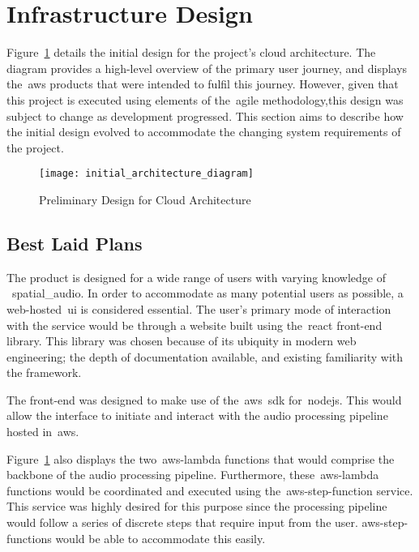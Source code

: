 \thispagestyle{plain}
\newpage
\section{Infrastructure Design}\label{sec:infrastructure-design}

\normalsize

Figure~\ref{fig:preliminary-design} details the initial design for the project's cloud architecture.
The diagram provides a high-level overview of the primary user journey,
and displays the~\gls{aws} products that were intended to fulfil this journey.
However, given that this project is executed using elements of the~\gls{agile} methodology,this design was subject to change as development progressed.
This section aims to describe how the initial design evolved to accommodate the changing system requirements of the project.

\begin{figure}[!htb]
    \minipage{\textwidth}
    \texttt{[image: initial\_architecture\_diagram]}
    \caption{Preliminary Design for Cloud Architecture}\label{fig:preliminary-design}
    \endminipage\hfill
\end{figure}

\subsection{Best Laid Plans}\label{subsec:best-laid-plans}

The product is designed for a wide range of users with varying knowledge of ~\gls{spatial_audio}.
In order to accommodate as many potential users as possible, a web-hosted~\gls{ui} is considered essential.
The user's primary mode of interaction with the service would be through a website
built using the~\gls{react} front-end library.
This library was chosen because of its ubiquity in modern web engineering; the depth of documentation available,
and existing familiarity with the framework.

The front-end was designed to make use of the~\gls{aws}~\gls{sdk} for~\gls{nodejs}.
This would allow the interface to initiate and interact with the audio processing pipeline hosted in~\gls{aws}.

Figure~\ref{fig:preliminary-design} also displays the two~\gls{aws-lambda} functions
that would comprise the backbone of the audio processing pipeline.
Furthermore,
these~\gls{aws-lambda} functions would be coordinated and executed using the~\gls{aws-step-function} service.
This service was highly desired for this purpose
since the processing pipeline would follow a series of discrete steps that require input from the user.
\glspl{aws-step-function} would be able to accommodate this easily.

